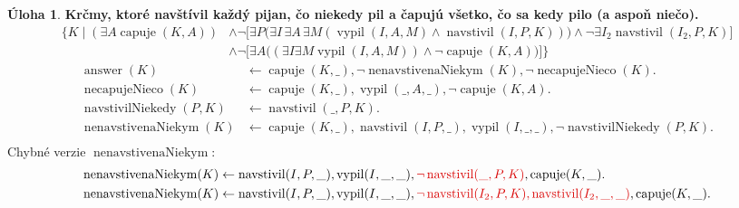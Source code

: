 \documentclass[10pt, a4paper]{article}
\theoremstyle{definition}
\newtheorem{problem}{Úloha}[section]
\def\beginwrong{\color{red!85!black}}
\def\endwrong{\color{black}}
\DeclareMathOperator{\capuje}{capuje}
\DeclareMathOperator{\navstivil}{navstivil}
\DeclareMathOperator{\vypil}{vypil}
\DeclareMathOperator{\answer}{answer}
\begin{document}
\begin{problem}
{\bf Krčmy, ktoré navštívil každý pijan, čo niekedy pil a čapujú všetko, čo sa kedy pilo (a aspoň niečo).}
\begin{align*}
\Big\{K\mid (\exists A\capuje(K, A))&\land \lnot \Big[\exists P\Big(\exists I\,\exists A\,\exists M (\vypil(I, A, M)\land \navstivil(I, P, K))\Big)\land \lnot\exists I_2\navstivil(I_2, P, K)\Big]\\
&\land \lnot\Big[\exists A \Big((\exists I\exists M \vypil(I, A, M))\land \lnot\capuje(K, A)\Big)\Big]\Big\}
\end{align*}
\begin{align*}
\answer(K) &\leftarrow \capuje(K, \_), \lnot\operatorname{nenavstivenaNiekym}(K), \lnot\operatorname{necapujeNieco}(K).\\
\operatorname{necapujeNieco}(K) &\leftarrow \capuje(K, \_), \vypil(\_, A, \_), \lnot\capuje(K, A).\\
\operatorname{navstivilNiekedy}(P, K) &\leftarrow \navstivil(\_, P, K).\\
\operatorname{nenavstivenaNiekym}(K) &\leftarrow \capuje(K, \_), \navstivil(I, P, \_), \vypil(I, \_, \_), \lnot\operatorname{navstivilNiekedy}(P, K).\\
\end{align*}
\beginwrong Chybné verzie $\operatorname{nenavstivenaNiekym}$:\endwrong
\begin{align*}
\operatorname{nenavstivenaNiekym}(K) &\leftarrow \navstivil(I, P, \_), \vypil(I, \_, \_), \beginwrong \lnot\navstivil(\_, P, K)\endwrong, \capuje(K, \_).\\
\operatorname{nenavstivenaNiekym}(K) &\leftarrow \navstivil(I, P, \_), \vypil(I, \_, \_), \beginwrong \lnot\navstivil(I_2, P, K), \navstivil(I_2, \_, \_)\endwrong, \capuje(K, \_).
\end{align*}
\end{problem}
\end{document}
